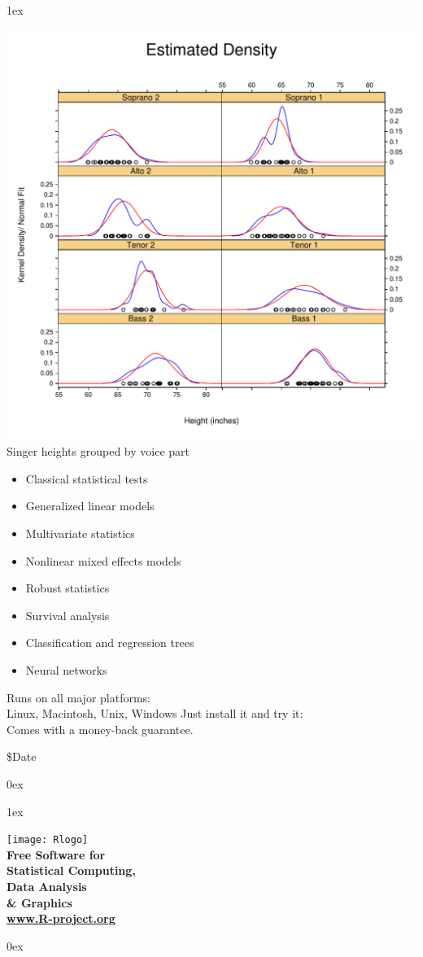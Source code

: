 \documentclass[landscape]{article}
\newlength{\colw}
\newcommand{\column}[1]{\hspace*{9mm}{}
  \parbox[t][0.99\textheight][t]{\colw}{\parskip1ex
    #1\parskip0ex}\hspace{9mm}{}}
\begin{document}
\column{
  \begin{center}
    \footnotesize\sf
    \includegraphics[width=\colw]{lattice-density}
    Singer heights grouped by voice part
  \end{center}

  \vfill
  \flushleft
  \begin{itemize}
   \item Classical statistical tests
   \item Generalized linear models
   \item Multivariate statistics
   \item Nonlinear mixed effects models
   \item Robust statistics
   \item Survival analysis
   \item Classification and regression trees
   \item Neural networks
  \end{itemize}
  \vfill
  Runs on all major platforms:\\
  Linux, Macintosh, Unix, Windows
  \vfill
  Just install it and try it:\\  Comes with a money-back guarantee.

  \begin{flushright}\tiny
    \$Date $\ $
  \end{flushright}
}
\column{
    \vfill
  \begin{center}
    \texttt{[image: Rlogo]}\\[2cm]
    \bf
    \Large
    Free Software for\\[1cm]
    \Huge
    Statistical Computing,\\ Data Analysis\\ \& Graphics\\[1cm]
    \Large
    \url{www.R-project.org}
  \end{center}
  \vfill
  }
\end{document}
